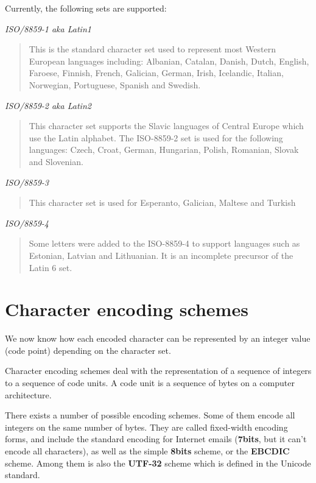 \documentclass[letterpaper,10pt,english]{sphinxmanual}
\begin{document}
Currently, the following sets are supported:

\emph{ISO/8859-1 aka Latin1}
\begin{quote}

This is the standard character set used to represent most Western European
languages including: Albanian, Catalan, Danish, Dutch, English, Faroese,
Finnish, French, Galician, German, Irish, Icelandic, Italian, Norwegian,
Portuguese, Spanish and Swedish.
\end{quote}

\emph{ISO/8859-2 aka Latin2}
\begin{quote}

This character set supports the Slavic languages of Central Europe which use
the Latin alphabet. The ISO-8859-2 set is used for the following languages:
Czech, Croat, German, Hungarian, Polish, Romanian, Slovak and Slovenian.
\end{quote}

\emph{ISO/8859-3}
\begin{quote}

This character set is used for Esperanto, Galician, Maltese and Turkish
\end{quote}

\emph{ISO/8859-4}
\begin{quote}

Some letters were added to the ISO-8859-4 to support languages such as
Estonian, Latvian and Lithuanian. It is an incomplete precursor of the Latin
6 set.
\end{quote}


\section{Character encoding schemes}
\label{unicode:character-encoding-schemes}
We now know how each encoded character can be represented by an integer value
(code point) depending on the character set.

Character encoding schemes deal with the representation of a sequence of
integers to a sequence of code units. A code unit is a sequence of bytes on a
computer architecture.

There exists a number of possible encoding schemes. Some of them encode all
integers on the same number of bytes. They are called fixed-width encoding
forms, and include the standard encoding for Internet emails (\textbf{7bits}, but it
can't encode all characters), as well as the simple \textbf{8bits} scheme, or the
\textbf{EBCDIC} scheme. Among them is also the \textbf{UTF-32} scheme which is defined in
the Unicode standard.
\end{document}

